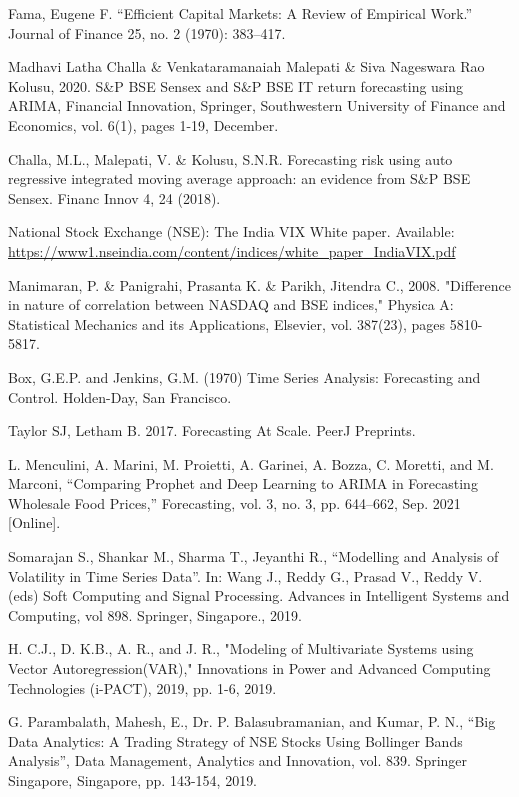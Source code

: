 \documentclass[conference]{IEEEtran}
\begin{document}
\begin{thebibliography}{00}
	 Fama, Eugene F. “Efficient Capital Markets: A Review of Empirical Work.” Journal of Finance 25, no. 2 (1970): 383–417.
	
	 Madhavi Latha Challa \& Venkataramanaiah Malepati \& Siva Nageswara Rao Kolusu, 2020. S\&P BSE Sensex and S\&P BSE IT return forecasting using ARIMA, Financial Innovation, Springer, Southwestern University of Finance and Economics, vol. 6(1), pages 1-19, December.
	
	 Challa, M.L., Malepati, V. \& Kolusu, S.N.R. Forecasting risk using auto regressive integrated moving average approach: an evidence from S\&P BSE Sensex. Financ Innov 4, 24 (2018).
	
	 National Stock Exchange (NSE): The India VIX White paper. Available: \href{https://www1.nseindia.com/content/indices/white\_paper\_IndiaVIX.pdf}{https://www1.nseindia.com/content/indices/white\_paper\_IndiaVIX.pdf}
	
	 Manimaran, P. \& Panigrahi, Prasanta K. \& Parikh, Jitendra C., 2008. "Difference in nature of correlation between NASDAQ and BSE indices," Physica A: Statistical Mechanics and its Applications, Elsevier, vol. 387(23), pages 5810-5817.
	
	 Box, G.E.P. and Jenkins, G.M. (1970) Time Series Analysis: Forecasting and Control. Holden-Day, San Francisco.
	
	 Taylor SJ, Letham B. 2017. Forecasting At Scale. PeerJ Preprints.
	
	 L. Menculini, A. Marini, M. Proietti, A. Garinei, A. Bozza, C. Moretti, and M. Marconi, “Comparing Prophet and Deep Learning to ARIMA in Forecasting Wholesale Food Prices,” Forecasting, vol. 3, no. 3, pp. 644–662, Sep. 2021 [Online].
	
	 Somarajan S., Shankar M., Sharma T., Jeyanthi R., “Modelling and Analysis of Volatility in Time Series Data”. In: Wang J., Reddy G., Prasad V., Reddy V. (eds) Soft Computing and Signal Processing. Advances in Intelligent Systems and Computing, vol 898. Springer, Singapore., 2019.
	
	 H. C.J., D. K.B., A. R., and J. R., "Modeling of Multivariate Systems using Vector Autoregression(VAR)," Innovations in Power and Advanced Computing Technologies (i-PACT), 2019, pp. 1-6, 2019.
	
	 G. Parambalath, Mahesh, E., Dr. P. Balasubramanian, and Kumar, P. N., “Big Data Analytics: A Trading Strategy of NSE Stocks Using Bollinger Bands Analysis”, Data Management, Analytics and Innovation, vol. 839. Springer Singapore, Singapore, pp. 143-154, 2019.
	

\end{thebibliography}
\end{document}
